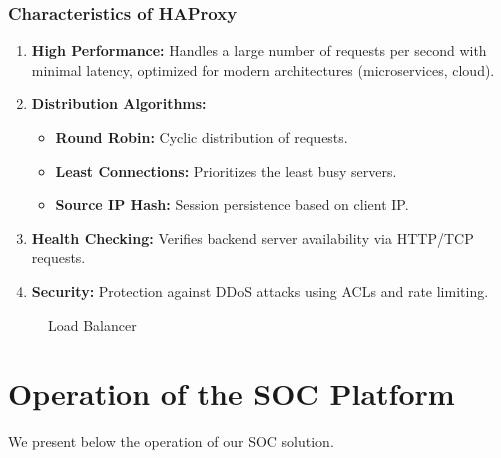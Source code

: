 \subsubsection{Characteristics of HAProxy}

\begin{enumerate}
    \item \textbf{High Performance:} Handles a large number of requests per second with minimal latency, optimized for modern architectures (microservices, cloud).

    \item \textbf{Distribution Algorithms:}
    \begin{itemize}
        \item \textbf{Round Robin:} Cyclic distribution of requests.
        \item \textbf{Least Connections:} Prioritizes the least busy servers.
        \item \textbf{Source IP Hash:} Session persistence based on client IP.
    \end{itemize}

    \item \textbf{Health Checking:} Verifies backend server availability via HTTP/TCP requests.

    \item \textbf{Security:} Protection against DDoS attacks using ACLs and rate limiting.
\end{enumerate}

\begin{figure}[H]
\centering
{}
\caption{Load Balancer}
\label{fig:loadbalancer}
\end{figure}

\section{Operation of the SOC Platform}
\label{sec:operation}

We present below the operation of our SOC solution.

